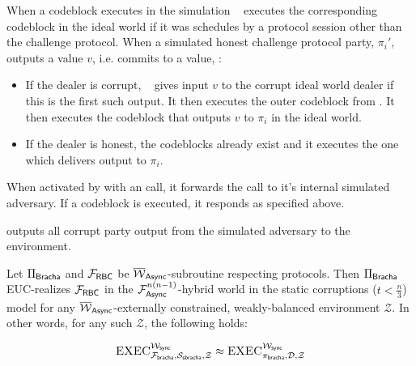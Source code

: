 When a codeblock executes in the simulation \Ssyncbracha~ executes the corresponding codeblock in the ideal world if it was schedules by a protocol session other than the challenge protocol.
When a simulated honest challenge protocol party, $\pi_i'$, outputs a value $v$, i.e. commits to a value, \Ssyncbracha:
\begin{itemize}
\item If the dealer is corrupt, \Ssyncbracha~ gives input $v$ to the corrupt ideal world dealer if this is the first such output. It then executes the outer codeblock from \Fbracha. It then executes the codeblock that outputs $v$ to $\pi_i$ in the ideal world.
\item If the dealer is honest, the codeblocks already exist and it executes the one which delivers output to $\pi_i$.
\end{itemize}

When activated by \Environment with an \Exec call, it forwards the call to it's internal simulated adversary. If a codeblock is executed, it responds as specified above. 

\Ssyncbracha outputs all corrupt party output from the simulated adversary to the environment.


\begin{theorem}\label{thm:async_bracha}

Let $\Pi_{{\mathsf {Bracha}}}$ and $\mathcal{F}_{{\mathsf {RBC}}}$ be $\overline{\mathcal{W}}_{{\mathsf {Async}}}$-subroutine respecting protocols. 
Then $\Pi_{{\mathsf {Bracha}}}$ EUC-realizes $\mathcal{F}_{{\mathsf {RBC}}}$ in the $\mathcal{F}^{n(n-1)}_{{\mathsf {Async}}}$-hybrid world in the static corruptions ($t < \frac{n}{3}$) model for any $\overline{\mathcal{W}}_{{\mathsf {Async}}}$-externally constrained, weakly-balanced environment $\mathcal{Z}$. In other words, for any such $\mathcal{Z}$, the following holds:

$$\textsc{EXEC}^{\mathcal{W}_{{\mathsf {sync}}}}_{\mathcal{F}_{{\mathsf {bracha}}}, \mathcal{S}_{{\mathsf {sbracha}}}, \mathcal{Z}} \approx \textsc{EXEC}^{\mathcal{W}_{{\mathsf {sync}}}}_{\pi_{{\mathsf {bracha}}}, \mathcal{D}, \mathcal{Z}}$$
\end{theorem}


